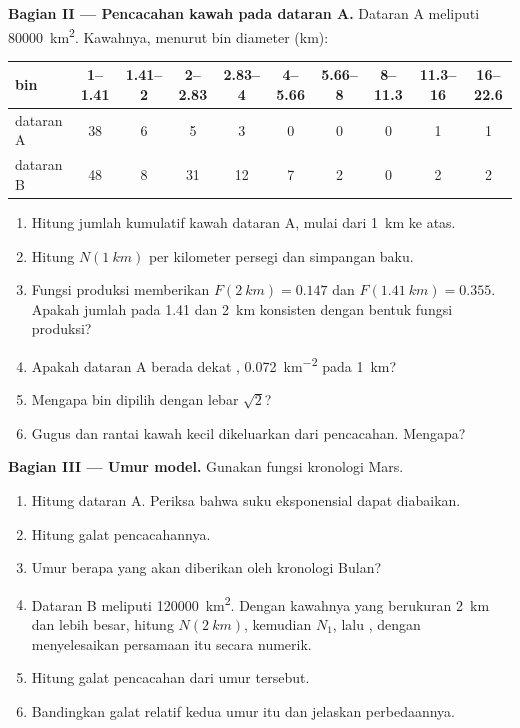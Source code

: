 \begin{problem}
\medskip\noindent\textbf{Bagian II --- Pencacahan kawah pada dataran A.} Dataran A
meliputi \qty{80000}{km^2}. Kawahnya, menurut bin diameter (km):
\begin{center}
\small
\begin{tabular}{lccccccccc}
\hline
bin & 1--1.41 & 1.41--2 & 2--2.83 & 2.83--4 & 4--5.66 & 5.66--8 & 8--11.3 & 11.3--16 & 16--22.6 \\
\hline
dataran A & 38 & 6 & 5 & 3 & 0 & 0 & 0 & 1 & 1 \\
dataran B & 48 & 8 & 31 & 12 & 7 & 2 & 0 & 2 & 2 \\
\hline
\end{tabular}
\end{center}
\begin{enumerate}[resume]
\item Hitung jumlah kumulatif kawah dataran A, mulai dari \qty{1}{km} ke atas.
\item Hitung $N(\qty{1}{km})$ per kilometer persegi dan simpangan
  baku.
\item Fungsi produksi memberikan $F(\qty{2}{km}) = 0.147$ dan
  $F(\qty{1.41}{km}) = 0.355$. Apakah jumlah pada 1.41 dan \qty{2}{km}
  konsisten dengan bentuk fungsi produksi?
\item Apakah dataran A berada dekat ,
  \qty{0.072}{km^{-2}} pada \qty{1}{km}?
\item Mengapa bin dipilih dengan lebar $\sqrt2$?
\item Gugus dan rantai kawah kecil dikeluarkan dari pencacahan. Mengapa?
\end{enumerate}

\medskip\noindent\textbf{Bagian III --- Umur model.} Gunakan fungsi
kronologi Mars.
\begin{enumerate}[resume]
\item Hitung  dataran A. Periksa bahwa suku eksponensial
  dapat diabaikan.
\item Hitung galat pencacahannya.
\item Umur berapa yang akan diberikan oleh kronologi Bulan?
\item Dataran B meliputi \qty{120000}{km^2}. Dengan kawahnya yang berukuran
  \qty{2}{km} dan lebih besar, hitung $N(\qty{2}{km})$, kemudian $N_1$, lalu , dengan
  menyelesaikan persamaan itu secara numerik.
\item Hitung galat pencacahan dari umur tersebut.
\item Bandingkan galat relatif kedua umur itu dan jelaskan
  perbedaannya.
\end{enumerate}


\end{problem}

